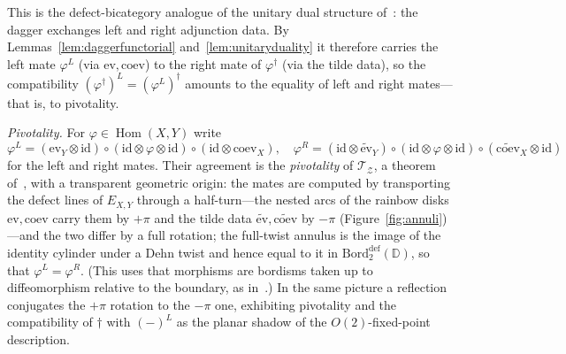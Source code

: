 \documentclass[11pt]{article}
\theoremstyle{definition}
\newcommand{\cT}{\mathcal{T}}
\newcommand{\cZ}{\mathcal{Z}}
\newcommand{\bD}{\mathbb{D}}
\newcommand{\Bord}{\mathrm{Bord}}
\newcommand{\Or}{O} %
\newcommand{\dg}{\dagger}
\begin{document}
This is the defect-bicategory analogue of the unitary dual structure of~\cite{Bar25}: the dagger exchanges left and right adjunction data. By Lemmas~\ref{lem:daggerfunctorial} and~\ref{lem:unitaryduality} it therefore carries the left mate $\varphi^L$ (via $\mathrm{ev}, \mathrm{coev}$) to the right mate of $\varphi^\dg$ (via the tilde data), so the compatibility $(\varphi^\dg)^L = (\varphi^L)^\dg$ amounts to the equality of left and right mates---that is, to pivotality.

\emph{Pivotality.} For $\varphi \in \operatorname{Hom}(X,Y)$ write
\begin{equation}
  \varphi^L = (\mathrm{ev}_Y \otimes \mathrm{id}) \circ (\mathrm{id} \otimes \varphi \otimes \mathrm{id}) \circ (\mathrm{id} \otimes \mathrm{coev}_X), \quad
  \varphi^R = (\mathrm{id} \otimes \widetilde{\mathrm{ev}}_Y) \circ (\mathrm{id} \otimes \varphi \otimes \mathrm{id}) \circ (\widetilde{\mathrm{coev}}_X \otimes \mathrm{id})
\end{equation}
for the left and right mates. Their agreement is the \emph{pivotality} of $\cT_\cZ$, a theorem of~\cite{DKR11}, with a transparent geometric origin: the mates are computed by transporting the defect lines of $E_{X,Y}$ through a half-turn---the nested arcs of the rainbow disks $\mathrm{ev}, \mathrm{coev}$ carry them by $+\pi$ and the tilde data $\widetilde{\mathrm{ev}}, \widetilde{\mathrm{coev}}$ by $-\pi$ (Figure~\ref{fig:annuli})---and the two differ by a full rotation; the full-twist annulus is the image of the identity cylinder under a Dehn twist and hence equal to it in $\Bord_2^{\textrm{def}}(\bD)$, so that $\varphi^L = \varphi^R$. (This uses that morphisms are bordisms taken up to diffeomorphism relative to the boundary, as in~\cite{DKR11}.) In the same picture a reflection conjugates the $+\pi$ rotation to the $-\pi$ one, exhibiting pivotality and the compatibility of $\dg$ with $(-)^L$ as the planar shadow of the $\Or(2)$-fixed-point description.
\end{document}
